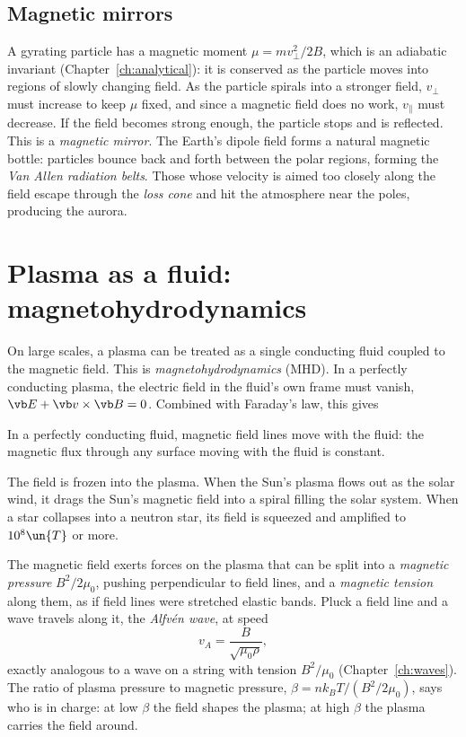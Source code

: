 \subsection{Magnetic mirrors}
A gyrating particle has a magnetic moment $\mu = mv_\perp^2/2B$, which is an adiabatic invariant (Chapter~\ref{ch:analytical}): it is conserved as the particle moves into regions of slowly changing field. As the particle spirals into a stronger field, $v_\perp$ must increase to keep $\mu$ fixed, and since a magnetic field does no work, $v_\parallel$ must decrease. If the field becomes strong enough, the particle stops and is reflected. This is a \emph{magnetic mirror}. The Earth's dipole field forms a natural magnetic bottle: particles bounce back and forth between the polar regions, forming the \emph{Van Allen radiation belts}. Those whose velocity is aimed too closely along the field escape through the \emph{loss cone} and hit the atmosphere near the poles, producing the aurora.

\section{Plasma as a fluid: magnetohydrodynamics}

On large scales, a plasma can be treated as a single conducting fluid coupled to the magnetic field. This is \emph{magnetohydrodynamics} (MHD). In a perfectly conducting plasma, the electric field in the fluid's own frame must vanish, $\vb E + \vb v\times\vb B = 0$. Combined with Faraday's law, this gives

\begin{theorem}
In a perfectly conducting fluid, magnetic field lines move with the fluid: the magnetic flux through any surface moving with the fluid is constant.
\end{theorem}

The field is frozen into the plasma. When the Sun's plasma flows out as the solar wind, it drags the Sun's magnetic field into a spiral filling the solar system. When a star collapses into a neutron star, its field is squeezed and amplified to $10^{8}\un{T}$ or more.

The magnetic field exerts forces on the plasma that can be split into a \emph{magnetic pressure} $B^2/2\mu_0$, pushing perpendicular to field lines, and a \emph{magnetic tension} along them, as if field lines were stretched elastic bands. Pluck a field line and a wave travels along it, the \emph{Alfv\'en wave}, at speed
\[
  v_A = \frac{B}{\sqrt{\mu_0\rho}} ,
\]
exactly analogous to a wave on a string with tension $B^2/\mu_0$ (Chapter~\ref{ch:waves}). The ratio of plasma pressure to magnetic pressure, $\beta = nk_BT/(B^2/2\mu_0)$, says who is in charge: at low $\beta$ the field shapes the plasma; at high $\beta$ the plasma carries the field around.

